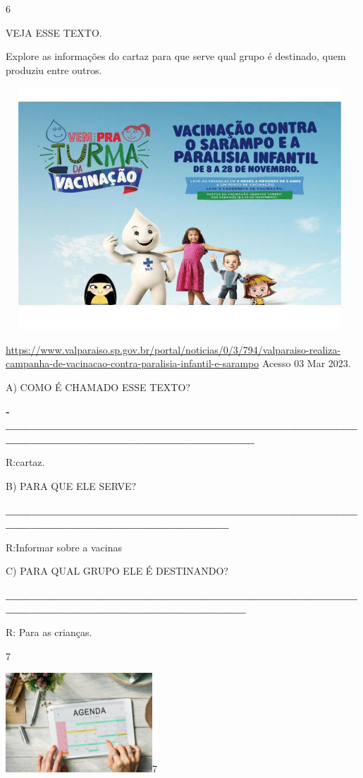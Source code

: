{{{{\num{6}

VEJA ESSE TEXTO.

Explore as informações do cartaz para que serve qual grupo é destinado,
quem produziu entre outros.

\includegraphics[width=5.14861in,height=3.58125in]{media/image107.jpeg}

\url{https://www.valparaiso.sp.gov.br/portal/noticias/0/3/794/valparaiso-realiza-campanha-de-vacinacao-contra-paralisia-infantil-e-sarampo}
Acesso 03 Mar 2023.

A) COMO É CHAMADO ESSE TEXTO?

\textbf{­­­­­­­­­­­­­­­­­­­­­\_\_\_\_\_\_\_\_\_\_\_\_\_\_\_\_\_\_\_\_\_\_\_\_\_\_\_\_\_\_\_\_\_\_\_\_\_\_\_\_\_\_\_\_\_\_\_\_\_\_\_\_\_\_\_\_\_\_\_\_\_\_\_\_\_\_\_\_\_\_}

R:cartaz.

B) PARA QUE ELE SERVE?

\textbf{\_\_\_\_\_\_\_\_\_\_\_\_\_\_\_\_\_\_\_\_\_\_\_\_\_\_\_\_\_\_\_\_\_\_\_\_\_\_\_\_\_\_\_\_\_\_\_\_\_\_\_\_\_\_\_\_\_\_\_\_\_\_\_\_\_\_\_}

R:Informar sobre a vacinas

C) PARA QUAL GRUPO ELE É DESTINANDO?

\textbf{\_\_\_\_\_\_\_\_\_\_\_\_\_\_\_\_\_\_\_\_\_\_\_\_\_\_\_\_\_\_\_\_\_\_\_\_\_\_\_\_\_\_\_\_\_\_\_\_\_\_\_\_\_\_\_\_\_\_\_\_\_\_\_\_\_\_\_\_\_}

R: Para as crianças.

\num{7}

{\texorpdfstring{\protect\includegraphics[width=2.16667in,height=1.47014in]{media/image108.jpeg}7
}{7 }}\label{section-48}

}}}}

